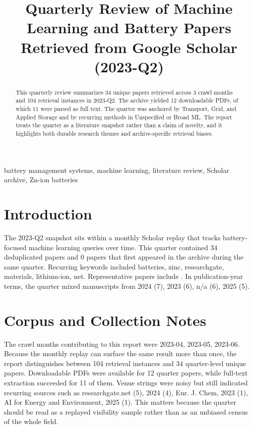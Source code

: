 \documentclass[conference]{IEEEtran}
\begin{document}
\title{ Quarterly Review of Machine Learning and Battery Papers Retrieved from Google Scholar (2023-Q2) }

\author{
}

\maketitle

\begin{abstract}
This quarterly review summarizes 34 unique papers retrieved across 3 crawl months and 104 retrieval instances in 2023-Q2. The archive yielded 12 downloadable PDFs, of which 11 were parsed as full text. The quarter was anchored by Transport, Grid, and Applied Storage and by recurring methods in Unspecified or Broad ML. The report treats the quarter as a literature snapshot rather than a claim of novelty, and it highlights both durable research themes and archive-specific retrieval biases.
\end{abstract}

\begin{IEEEkeywords}
battery management systems, machine learning, literature review, Scholar archive, Zn-ion batteries
\end{IEEEkeywords}

\section{Introduction}
The 2023-Q2 snapshot sits within a monthly Scholar replay that tracks battery-focused machine learning queries over time. This quarter contained 34 deduplicated papers and 0 papers that first appeared in the archive during the same quarter. Recurring keywords included batteries, zinc, researchgate, materials, lithium-ion, net. Representative papers include \cite{machinelearningdriven2025,recentadvancesin2025,aphysicsinspired2023,datadrivenapproaches2024}. In publication-year terms, the quarter mixed manuscripts from 2024 (7), 2023 (6), n/a (6), 2025 (5).

\section{Corpus and Collection Notes}
The crawl months contributing to this report were 2023-04, 2023-05, 2023-06. Because the monthly replay can surface the same result more than once, the report distinguishes between 104 retrieval instances and 34 quarter-level unique papers. Downloadable PDFs were available for 12 quarter papers, while full-text extraction succeeded for 11 of them. Venue strings were noisy but still indicated recurring sources such as researchgate.net (5), 2024 (4), Eur. J. Chem, 2023 (1), AI for Energy and Environment, 2025 (1). This matters because the quarter should be read as a replayed visibility sample rather than as an unbiased census of the whole field.
\end{document}
